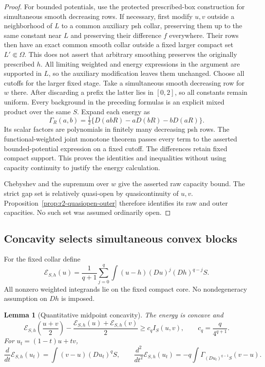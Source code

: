 \documentclass[11pt,a4paper]{article}
\numberwithin{equation}{section}
\newtheorem{lemma}[theorem]{Lemma}
\theoremstyle{definition}
\theoremstyle{remark}
\begin{document}
\begin{proof}
For bounded potentials, use the protected prescribed-box
construction for simultaneous smooth decreasing rows. If necessary,
first modify $u,v$ outside a neighborhood of $L$ to a common
auxiliary psh collar, preserving them up to the same constant
near $L$ and preserving their difference $f$ everywhere. Their
rows then have an exact common smooth collar outside a fixed
larger compact set $L'\Subset\Omega$. This does not assert that
arbitrary smoothing preserves the originally prescribed $h$.
All limiting weighted and energy expressions in the argument
are supported in $L$, so the auxiliary modification leaves
them unchanged. Choose all cutoffs for the larger fixed stage.
Take a simultaneous smooth decreasing row for $w$ there.
After discarding a prefix the latter lies in $[0,2]$,
so all constants remain uniform. Every background in
the preceding formulas is an explicit mixed product over the
same $S$. Expand each energy as
\[
 \Gamma_R(a,b)=\tfrac12\{D(abR)-aD(bR)-bD(aR)\}.
\]
Its scalar factors are polynomials in finitely many decreasing
psh rows. The functional-weighted joint monotone theorem passes
every term to the asserted bounded-potential expression on a
fixed cutoff. The differences retain fixed compact support.
This proves the identities and inequalities without using
capacity continuity to justify the energy calculation.

Chebyshev and the supremum over $w$ give the asserted raw
capacity bound. The strict gap set is relatively quasi-open
by quasicontinuity of $u,v$. Proposition~\ref{prop:r2-quasiopen-outer}
therefore identifies its raw and outer capacities. No such
set was assumed ordinarily open.
\end{proof}

\subsection{Concavity selects simultaneous convex blocks}

For the fixed collar define
\[
 \mathcal E_{S,h}(u)
   =\frac1{q+1}\sum_{j=0}^q
       \int(u-h)(Du)^j(Dh)^{q-j}S.
\]
All nonzero weighted integrands lie on the fixed compact core.
No nondegeneracy assumption on $Dh$ is imposed.

\begin{lemma}[Quantitative midpoint concavity]
\label{lem:r3-energy-midpoint}
The energy is concave and
\begin{equation}
 \label{eq:r3-midpoint-I-bound}
 \mathcal E_{S,h}\!\left(\frac{u+v}{2}\right)
  -\frac{\mathcal E_{S,h}(u)+\mathcal E_{S,h}(v)}2
      \geq c_q I_S(u,v),\qquad c_q=\frac q{4^{q+1}}.
\end{equation}
For $u_t=(1-t)u+tv$,
\[
 \frac{d}{dt}\mathcal E_{S,h}(u_t)=\int(v-u)(Du_t)^qS,
 \qquad
 \frac{d^2}{dt^2}\mathcal E_{S,h}(u_t)
       =-q\int\Gamma_{(Du_t)^{q-1}S}(v-u).
\]
\end{lemma}
\end{document}
